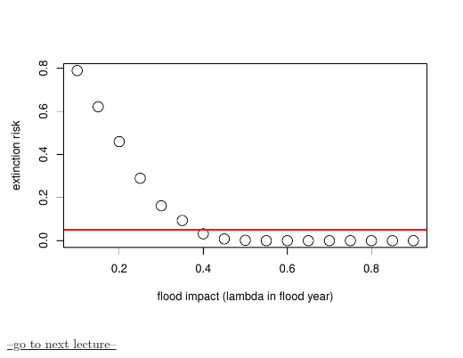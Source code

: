 \documentclass[
]{article}
\begin{document}
\includegraphics{LECTURE12_files/figure-latex/unnamed-chunk-8-1.pdf}

\href{LECTURE13.html}{--go to next lecture--}
\end{document}
